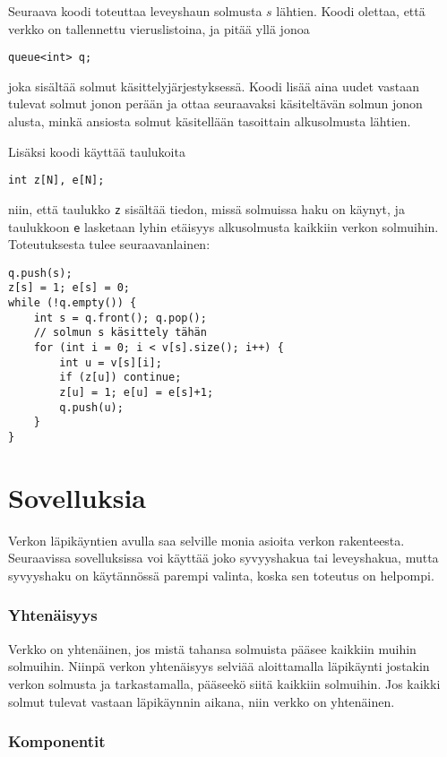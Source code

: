 Seuraava koodi toteuttaa leveyshaun
solmusta $s$ lähtien.
Koodi olettaa, että verkko on tallennettu
vieruslistoina, ja pitää yllä jonoa
\begin{lstlisting}
queue<int> q;
\end{lstlisting}
joka sisältää solmut käsittelyjärjestyksessä.
Koodi lisää aina uudet vastaan tulevat solmut
jonon perään ja ottaa seuraavaksi käsiteltävän
solmun jonon alusta,
minkä ansiosta solmut käsitellään tasoittain
alkusolmusta lähtien.

Lisäksi koodi käyttää taulukoita
\begin{lstlisting}
int z[N], e[N];
\end{lstlisting}
niin, että taulukko \texttt{z} sisältää tiedon,
missä solmuissa haku on käynyt,
ja taulukkoon \texttt{e} lasketaan lyhin
etäisyys alkusolmusta kaikkiin verkon solmuihin.
Toteutuksesta tulee seuraavanlainen:
\begin{lstlisting}
q.push(s);
z[s] = 1; e[s] = 0;
while (!q.empty()) {
    int s = q.front(); q.pop();
    // solmun s käsittely tähän     
    for (int i = 0; i < v[s].size(); i++) {
        int u = v[s][i];
        if (z[u]) continue;
        z[u] = 1; e[u] = e[s]+1;
        q.push(u);
    }
}
\end{lstlisting}

\section{Sovelluksia}

Verkon läpikäyntien avulla
saa selville monia asioita
verkon rakenteesta.
Seuraavissa sovelluksissa
voi käyttää joko
syvyyshakua tai leveyshakua,
mutta syvyyshaku
on käytännössä parempi valinta,
koska sen toteutus on helpompi.

\subsubsection{Yhtenäisyys}

Verkko on yhtenäinen,
jos mistä tahansa solmuista
pääsee kaikkiin muihin solmuihin.
Niinpä verkon yhtenäisyys selviää
aloittamalla läpikäynti
jostakin verkon solmusta ja
tarkastamalla, pääseekö siitä kaikkiin solmuihin.
Jos kaikki solmut
tulevat vastaan läpikäynnin aikana,
niin verkko on yhtenäinen.

\subsubsection{Komponentit}

